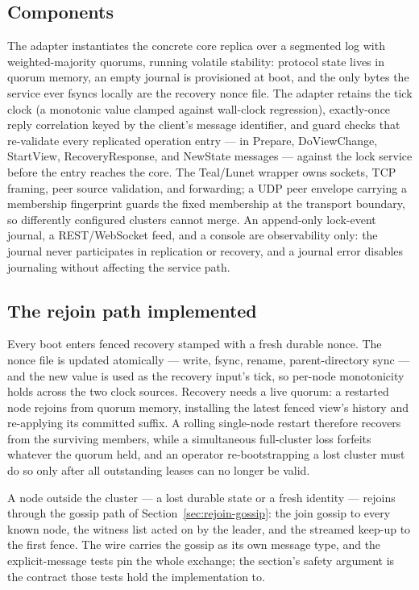 \documentclass[10pt,journal,letterpaper]{IEEEtran}
\begin{document}
\subsection{Components}
The adapter instantiates the concrete core replica over a segmented log with
weighted-majority quorums, running volatile stability: protocol state lives
in quorum memory, an empty journal is provisioned at boot, and the only bytes
the service ever fsyncs locally are the recovery nonce file. The adapter
retains the tick clock (a monotonic value clamped against wall-clock
regression), exactly-once reply correlation keyed by the client's message
identifier, and guard checks that re-validate every replicated operation
entry --- in Prepare, DoViewChange, StartView, RecoveryResponse, and NewState
messages --- against the lock service before the entry reaches the core. The
Teal/Lunet wrapper owns sockets, TCP framing, peer source validation, and
forwarding; a UDP peer envelope carrying a membership fingerprint guards the
fixed membership at the transport boundary, so differently configured
clusters cannot merge. An append-only lock-event journal, a REST/WebSocket
feed, and a console are observability only: the journal never participates in
replication or recovery, and a journal error disables journaling without
affecting the service path.

\subsection{The rejoin path implemented}
Every boot enters fenced recovery stamped with a fresh durable nonce. The
nonce file is updated atomically --- write, fsync, rename, parent-directory
sync --- and the new value is used as the recovery input's tick, so
per-node monotonicity holds across the two clock sources. Recovery needs a
live quorum: a restarted node rejoins from quorum memory, installing the
latest fenced view's history and re-applying its committed suffix. A rolling
single-node restart therefore recovers from the surviving members, while a
simultaneous full-cluster loss forfeits whatever the quorum held, and an
operator re-bootstrapping a lost cluster must do so only after all
outstanding leases can no longer be valid.

A node outside the cluster --- a lost durable state or a fresh identity ---
rejoins through the gossip path of
Section~\ref{sec:rejoin-gossip}: the join gossip to every known node, the
witness list acted on by the leader, and the streamed keep-up to the first
fence. The wire carries the gossip as its own message type, and the
explicit-message tests pin the whole exchange; the section's safety
argument is the contract those tests hold the implementation to.
\end{document}
